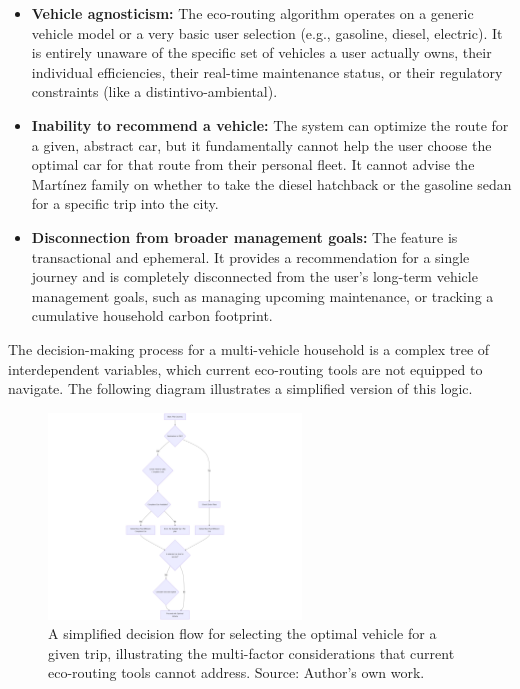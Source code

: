 \begin{itemize}
    \item \textbf{Vehicle agnosticism:} The eco-routing algorithm operates on a generic vehicle model or a very basic user selection (e.g., gasoline, diesel, electric). It is entirely unaware of the specific set of vehicles a user actually owns, their individual efficiencies, their real-time maintenance status, or their regulatory constraints (like a \gls{distintivo-ambiental}).
    
    \textgap
    
    \item \textbf{Inability to recommend a vehicle:} The system can optimize the route for a given, abstract car, but it fundamentally cannot help the user choose the optimal car for that route from their personal fleet. It cannot advise the Martínez family on whether to take the diesel hatchback or the gasoline sedan for a specific trip into the city.
    
    \textgap
    
    \item \textbf{Disconnection from broader management goals:} The feature is transactional and ephemeral. It provides a recommendation for a single journey and is completely disconnected from the user's long-term vehicle management goals, such as managing upcoming maintenance, or tracking a cumulative household carbon footprint.
\end{itemize}

\textgap

The decision-making process for a multi-vehicle household is a complex tree of interdependent variables, which current eco-routing tools are not equipped to navigate. The following diagram illustrates a simplified version of this logic.

\textgap

\begin{figure}[H]
    \centering
    \includegraphics[width=0.6\textwidth]{images/background/simplified-decision-flow.png}
    \caption{A simplified decision flow for selecting the optimal vehicle for a given trip, illustrating the multi-factor considerations that current eco-routing tools cannot address. Source: Author's own work.}
\end{figure}

